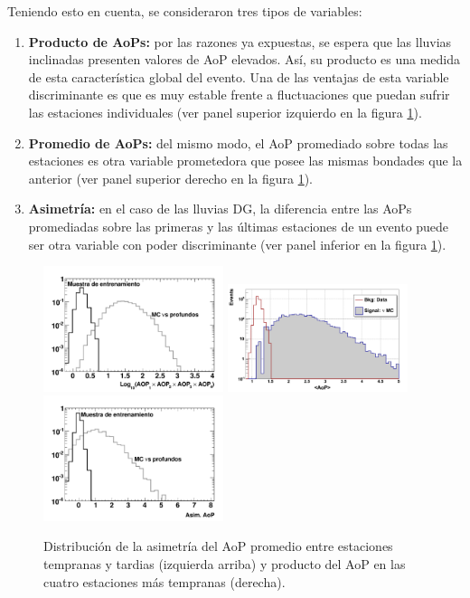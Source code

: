 	Teniendo esto en cuenta, se consideraron tres tipos de variables:
	\begin{enumerate}
	 \item \textbf{Producto de AoPs:} por las razones ya expuestas, se espera que las lluvias inclinadas presenten valores de AoP elevados. Así, su producto es una medida de esta característica global del evento. Una de las ventajas de esta variable discriminante es que es muy estable frente a fluctuaciones que puedan sufrir las estaciones individuales (ver panel superior izquierdo en la figura \ref{fig:observablesGlobales}). 
	 \item \textbf{Promedio de AoPs:} del mismo modo, el AoP promediado sobre todas las estaciones es otra variable prometedora que posee las mismas bondades que la anterior (ver panel superior derecho en la figura \ref{fig:observablesGlobales}).
	 \item \textbf{Asimetría:} en el caso de las lluvias DG, la diferencia entre las AoPs promediadas sobre las primeras  y las últimas estaciones de un evento puede ser otra variable con poder discriminante (ver panel inferior en la figura \ref{fig:observablesGlobales}). 
	\end{enumerate}
	\begin{figure}
	\begin{center}
	\includegraphics[width=0.47\textwidth]{fig/seleccionAuger/aop_prod.pdf} \hfill
	\includegraphics[width=0.47\textwidth]{fig/seleccionAuger/trainning_withMCSimple_log_forThesis}\\
	\includegraphics[width=0.47\textwidth]{fig/seleccionAuger/asim.pdf}
	
	\caption{Distribución de la asimetría del AoP promedio entre estaciones tempranas y tardias (izquierda arriba) y producto del AoP en las cuatro estaciones más tempranas (derecha).}
	\label{fig:observablesGlobales}
	\end{center}
	\end{figure}
